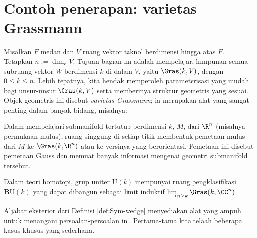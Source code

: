 \section{Contoh penerapan: varietas Grassmann}\label{sec:Grassmannian}
Misalkan $F$ medan dan $V$ ruang vektor taknol berdimensi hingga atas $F$. Tetapkan $n := \dim_F V$. Tujuan bagian ini adalah mempelajari himpunan semua subruang vektor $W$ berdimensi $k$ di dalam $V$, yaitu $\Gras(k, V)$, dengan $0 \leq k \leq n$. Lebih tepatnya, kita hendak memperoleh parameterisasi yang mudah bagi unsur-unsur $\Gras(k,V)$ serta memberinya struktur geometris yang sesuai. Objek geometris ini disebut \emph{varietas Grassmann}; ia merupakan alat yang sangat penting dalam banyak bidang, misalnya: 
\begin{compactenum}[(a)]
	\item Dalam mempelajari submanifold tertutup berdimensi $k$, $M$, dari $\R^n$ (misalnya permukaan mulus), ruang singgung di setiap titik membentuk pemetaan mulus dari $M$ ke $\Gras(k, \R^n)$ atau ke versinya yang berorientasi. Pemetaan ini disebut pemetaan Gauss dan memuat banyak informasi mengenai geometri submanifold tersebut.
	\item Dalam teori homotopi, grup uniter $\mathrm{U}(k)$ mempunyai ruang pengklasifikasi $\mathbf{B}\mathrm{U}(k)$ yang dapat dibangun sebagai limit induktif $\varinjlim_{n \geq k}\Gras(k, \CC^n)$.
\end{compactenum}
Aljabar eksterior dari Definisi \ref{def:Sym-wedge} menyediakan alat yang ampuh untuk menangani persoalan-persoalan ini. Pertama-tama kita telaah beberapa kasus khusus yang sederhana.
